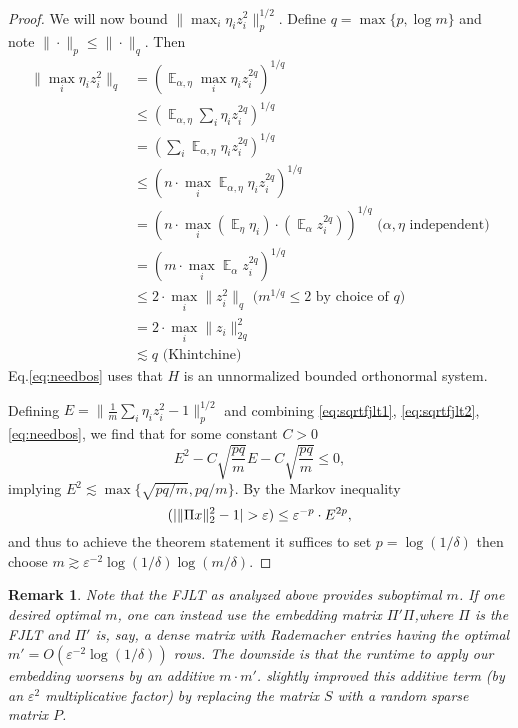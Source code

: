 \documentclass[11pt]{article}
\DeclareMathOperator*{\E}{\mathbb{E}}
\let\Pr\relax
\DeclareMathOperator*{\Pr}{\mathbb{P}}
\newcommand{\eps}{\varepsilon}
\newcommand{\Eqsub}[1]{\eqref{eq:#1}}
\newcommand{\EquationName}[1]{\label{eq:#1}}
\newcommand{\Equation}[1]{Eq.\:\eqref{eq:#1}}
\newtheorem{remark}[theorem]{Remark}
\begin{document}
\begin{proof}
We will now bound $\|\max_i \eta_i z_i^2\|_p^{1/2}$. Define $q = \max\{p, \log m\}$ and note $\|\cdot\|_p \le \|\cdot\|_q$. Then
\begin{align}
\nonumber \|\max_i \eta_i z_i^2\|_q &= \left(\E_{\alpha, \eta}\max_i \eta_i z_i^{2q}\right)^{1/q}\\
\nonumber &\le \left(\E_{\alpha, \eta}\sum_i \eta_i z_i^{2q}\right)^{1/q} \\
\nonumber &= \left(\sum_i \E_{\alpha, \eta} \eta_i z_i^{2q}\right)^{1/q} \\
\nonumber &\le \left(n\cdot \max_i \E_{\alpha, \eta} \eta_i z_i^{2q}\right)^{1/q} \\
\nonumber &= \left(n\cdot \max_i (\E_{\eta} \eta_i)\cdot (\E_\alpha z_i^{2q})\right)^{1/q} \text{ (}\alpha, \eta\text{ independent)}\\
\nonumber &= \left(m\cdot \max_i \E_\alpha z_i^{2q}\right)^{1/q}\\
\nonumber {}&\le 2\cdot \max_i \| z_i^2 \|_q\text{ (}m^{1/q} \le 2\text{ by choice of }q\text{)}\\
\nonumber {}&= 2\cdot \max_i\|z_i\|_{2q}^2\\
{}&\lesssim q \text{ (Khintchine)} \EquationName{needbos}
\end{align}
\Equation{needbos} uses that $H$ is an unnormalized bounded orthonormal system.

Defining $E = \|\frac 1m\sum_i \eta_i z_i^2 - 1\|_p^{1/2}$ and combining \Eqsub{sqrtfjlt1}, \Eqsub{sqrtfjlt2}, \Eqsub{needbos}, we find that for some constant $C>0$
$$
E^2 - C\sqrt{\frac{pq}m}E - C\sqrt{\frac{pq}m} \le 0 ,
$$
implying $E^2\lesssim \max\{\sqrt{pq/m}, pq/m\}$. By the Markov inequality
$$
\Pr(|\|\Pi x\|_2^2 - 1| > \eps) \le \eps^{-p}\cdot E^{2p} ,
$$
and thus to achieve the theorem statement it suffices to set $p = \log(1/\delta)$ then choose $m\gtrsim \eps^{-2}\log(1/\delta)\log(m/\delta)$.
\end{proof}

\begin{remark}
\textup{
Note that the FJLT as analyzed above provides suboptimal $m$. If one desired optimal $m$, one can instead use the embedding matrix $\Pi' \Pi$,where $\Pi$ is the FJLT and $\Pi'$ is, say, a dense matrix with Rademacher entries having the optimal $m' = O(\eps^{-2}\log(1/\delta))$ rows. The downside is that the runtime to apply our embedding worsens by an additive $m\cdot m'$. \cite{ailon2009fast} slightly improved this additive term (by an $\eps^2$ multiplicative factor) by replacing the matrix $S$ with a random sparse matrix $P$.
}
\end{remark}
\end{document}
